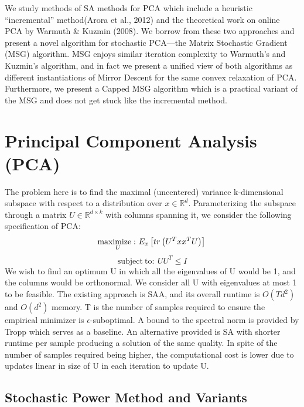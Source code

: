 \documentclass{article}
\begin{document}
We study methods of SA methods for PCA which include a heuristic “incremental” method(Arora et al., 2012) and the theoretical work on online PCA by Warmuth \& Kuzmin (2008). We borrow from these two approaches and present a novel algorithm for stochastic PCA—the Matrix Stochastic Gradient (MSG) algorithm. MSG enjoys similar iteration complexity to Warmuth’s and Kuzmin’s algorithm, and in fact we present a unified view of both algorithms as different instantiations of Mirror Descent for the same convex relaxation of PCA. Furthermore, we present a Capped MSG algorithm which is a practical variant of the MSG and does not get stuck like the incremental method. 


\section{Principal Component Analysis (PCA)}
The problem here is to find the maximal (uncentered) variance k-dimensional subspace with respect to a distribution over $x\in \mathbb{R} ^{d}$. Parameterizing the subspace through a matrix $U\in \mathbb{R} ^{d\times k}$ with columns spanning it, we consider the following specification of PCA:
\begin{equation}\label{eq:1} 
\underset{U}{\mathrm{maximize :\ }}{E}_{x}\left[ tr\left( U^{T}xx^{T}U\right)\right] \\
\end{equation}
\begin{equation}
\mathrm{subject\ to :\ }UU^{T}\leq I
\end{equation}
We wish to find an optimum U in which all the eigenvalues of U would be 1, and the columns would be orthonormal. We consider all U with eigenvalues at most 1 to be feasible. The existing approach is SAA, and its overall runtime is $O\left( Td^{2}\right) $ and $O\left( d^{2}\right)$ memory. T is the number of samples required to ensure the empirical minimizer is $\epsilon$-suboptimal. A bound to the spectral norm is provided by Tropp which serves as a baseline. An alternative provided is SA with shorter runtime per sample producing a solution of the same quality. In spite of the number of samples required being higher, the computational cost is lower due to updates linear in size of U in each iteration to update U.

\subsection{Stochastic Power Method and Variants}
\end{document}
